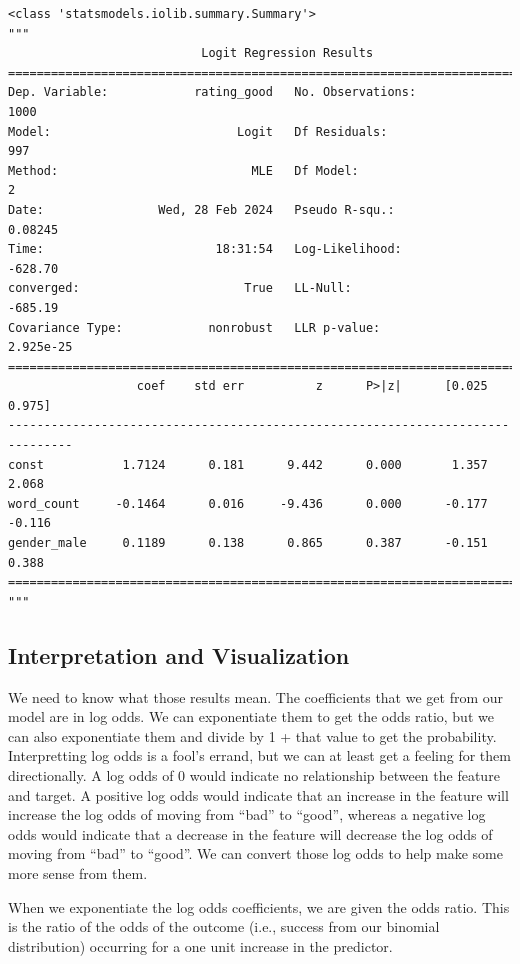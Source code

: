 \documentclass[
  letterpaper,
]{krantz}
\begin{document}
\begin{verbatim}
<class 'statsmodels.iolib.summary.Summary'>
"""
                           Logit Regression Results                           
==============================================================================
Dep. Variable:            rating_good   No. Observations:                 1000
Model:                          Logit   Df Residuals:                      997
Method:                           MLE   Df Model:                            2
Date:                Wed, 28 Feb 2024   Pseudo R-squ.:                 0.08245
Time:                        18:31:54   Log-Likelihood:                -628.70
converged:                       True   LL-Null:                       -685.19
Covariance Type:            nonrobust   LLR p-value:                 2.925e-25
===============================================================================
                  coef    std err          z      P>|z|      [0.025      0.975]
-------------------------------------------------------------------------------
const           1.7124      0.181      9.442      0.000       1.357       2.068
word_count     -0.1464      0.016     -9.436      0.000      -0.177      -0.116
gender_male     0.1189      0.138      0.865      0.387      -0.151       0.388
===============================================================================
"""
\end{verbatim}

\subsection{Interpretation and
Visualization}\label{sec-glm-binomial-interpret}

We need to know what those results mean. The coefficients that we get
from our model are in log odds. We can exponentiate them to get the odds
ratio, but we can also exponentiate them and divide by 1 + that value to
get the probability. Interpretting log odds is a fool's errand, but we
can at least get a feeling for them directionally. A log odds of 0 would
indicate no relationship between the feature and target. A positive log
odds would indicate that an increase in the feature will increase the
log odds of moving from ``bad'' to ``good'', whereas a negative log odds
would indicate that a decrease in the feature will decrease the log odds
of moving from ``bad'' to ``good''. We can convert those log odds to
help make some more sense from them.

When we exponentiate the log odds coefficients, we are given the odds
ratio. This is the ratio of the odds of the outcome (i.e., success from
our binomial distribution) occurring for a one unit increase in the
predictor.
\end{document}
